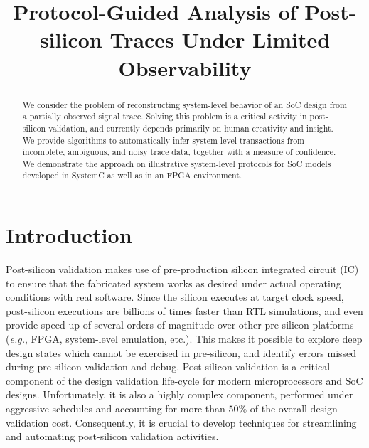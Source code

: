 \documentclass[conference]{IEEEtran}
\title{\Large {\bf Protocol-Guided Analysis of Post-silicon
  Traces Under Limited Observability}}
\newcommand{\eg}{\mbox{{\em e.g.}}}
\begin{document}
\maketitle

\begin{abstract}
We consider the problem of reconstructing system-level
behavior of an SoC design from a partially observed signal
trace.  Solving this problem is a critical activity in
post-silicon validation, and currently depends primarily on
human creativity and insight.  We provide algorithms to
automatically infer system-level transactions from
incomplete, ambiguous, and noisy trace data, together with a
measure of confidence.  We demonstrate the approach on
illustrative system-level protocols for SoC models developed
in SystemC as well as in an FPGA environment.
\end{abstract}

\section{Introduction}

Post-silicon validation makes use of pre-production silicon
integrated circuit (IC) to ensure that the fabricated system
works as desired under actual operating conditions with real
software.  Since the silicon executes at target clock speed,
post-silicon executions are billions of times faster than
RTL simulations, and even provide speed-up of several orders
of magnitude over other pre-silicon platforms (\eg, FPGA,
system-level emulation, etc.).  This makes it possible to
explore deep design states which cannot be exercised in
pre-silicon, and identify errors missed during pre-silicon
validation and debug.  Post-silicon validation is a critical
component of the design validation life-cycle for modern
microprocessors and SoC designs.  Unfortunately, it is also
a highly complex component, performed under aggressive
schedules and accounting for more than $50\%$ of the overall
design validation cost.  Consequently, it is crucial to
develop techniques for streamlining and automating
post-silicon validation activities.
\end{document}
